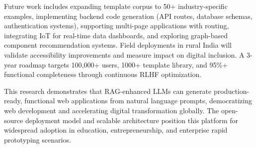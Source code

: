 \documentclass[10pt, conference, letterpaper]{IEEEtran}
\begin{document}
Future work includes expanding template corpus to 50+ industry-specific examples, implementing backend code generation (API routes, database schemas, authentication systems), supporting multi-page applications with routing, integrating IoT for real-time data dashboards, and exploring graph-based component recommendation systems. Field deployments in rural India will validate accessibility improvements and measure impact on digital inclusion. A 3-year roadmap targets 100,000+ users, 1000+ template library, and 95\%+ functional completeness through continuous RLHF optimization.

This research demonstrates that RAG-enhanced LLMs can generate production-ready, functional web applications from natural language prompts, democratizing web development and accelerating digital transformation globally. The open-source deployment model and scalable architecture position this platform for widespread adoption in education, entrepreneurship, and enterprise rapid prototyping scenarios.
\end{document}
